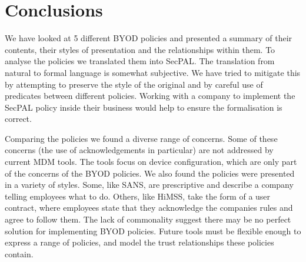 \documentclass[conference,twocolumn]{IEEEtran}
\newcommand{\comment}[1]{}
\begin{document}
\section{Conclusions}
\label{sec:conclusions}

We have looked at 5 different BYOD policies and presented a summary of their contents, their styles of presentation and the relationships within them.
To analyse the policies we translated them into SecPAL.
The translation from natural to formal language is somewhat subjective.
We have tried to mitigate this by attempting to preserve the style of the original and by careful use of predicates between different policies.
Working with a company to implement the SecPAL policy inside their business would help to ensure the formalisation is correct.

Comparing the policies we found a diverse range of concerns.
Some of these concerns (the use of acknowledgements in particular) are not addressed by current MDM tools.
The tools focus on device configuration, which are only part of the concerns of the BYOD policies.
We also found the policies were presented in a variety of styles.
Some, like SANS, are prescriptive and describe a company telling employees what to do.
Others, like HiMSS, take the form of a user contract, where employees state that they acknowledge the companies rules and agree to follow them.
The lack of commonality suggest there may be no perfect solution for implementing BYOD policies.
Future tools must be flexible enough to express a range of policies, and model the trust relationships these policies contain.

\comment{%
\begin{itemize}
  \item Our formalisation of the policies is subjective.
  \item Remarks about lack of commonality.
\end{itemize}
}

\printbibliography{}
\end{document}
